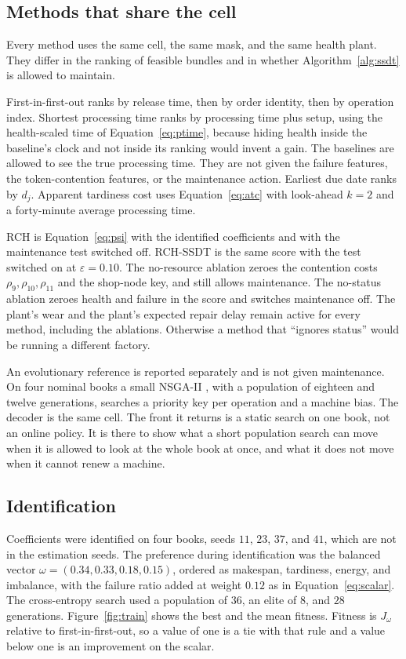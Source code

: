 \subsection{Methods that share the cell}

Every method uses the same cell, the same mask, and the same health plant. They differ in the ranking of feasible bundles and in whether Algorithm~\ref{alg:ssdt} is allowed to maintain.

First-in-first-out ranks by release time, then by order identity, then by operation index. Shortest processing time ranks by processing time plus setup, using the health-scaled time of Equation~\eqref{eq:ptime}, because hiding health inside the baseline's clock and not inside its ranking would invent a gain. The baselines are allowed to see the true processing time. They are not given the failure features, the token-contention features, or the maintenance action. Earliest due date ranks by \(d_j\). Apparent tardiness cost uses Equation~\eqref{eq:atc} with look-ahead \(k = 2\) and a forty-minute average processing time.

RCH is Equation~\eqref{eq:psi} with the identified coefficients and with the maintenance test switched off. RCH-SSDT is the same score with the test switched on at \(\varepsilon = 0.10\). The no-resource ablation zeroes the contention costs \(\rho_9,\rho_{10},\rho_{11}\) and the shop-node key, and still allows maintenance. The no-status ablation zeroes health and failure in the score and switches maintenance off. The plant's wear and the plant's expected repair delay remain active for every method, including the ablations. Otherwise a method that ``ignores status'' would be running a different factory.

An evolutionary reference is reported separately and is not given maintenance. On four nominal books a small NSGA-II \cite{deb2002}, with a population of eighteen and twelve generations, searches a priority key per operation and a machine bias. The decoder is the same cell. The front it returns is a static search on one book, not an online policy. It is there to show what a short population search can move when it is allowed to look at the whole book at once, and what it does not move when it cannot renew a machine.

\subsection{Identification}

Coefficients were identified on four books, seeds \(11\), \(23\), \(37\), and \(41\), which are not in the estimation seeds. The preference during identification was the balanced vector \(\omega = (0.34, 0.33, 0.18, 0.15)\), ordered as makespan, tardiness, energy, and imbalance, with the failure ratio added at weight \(0.12\) as in Equation~\eqref{eq:scalar}. The cross-entropy search used a population of \(36\), an elite of \(8\), and \(28\) generations. Figure~\ref{fig:train} shows the best and the mean fitness. Fitness is \(J_\omega\) relative to first-in-first-out, so a value of one is a tie with that rule and a value below one is an improvement on the scalar.

